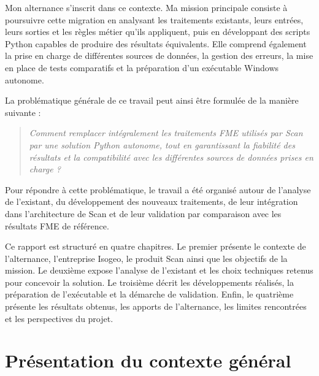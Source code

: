 Mon alternance s'inscrit dans ce contexte. Ma mission principale consiste à
poursuivre cette migration en analysant les traitements existants, leurs
entrées, leurs sorties et les règles métier qu'ils appliquent, puis en
développant des scripts Python capables de produire des résultats équivalents.
Elle comprend également la prise en charge de différentes sources de données,
la gestion des erreurs, la mise en place de tests comparatifs et la préparation
d'un exécutable Windows autonome.

La problématique générale de ce travail peut ainsi être formulée de la manière
suivante :

\begin{quote}
\textit{Comment remplacer intégralement les traitements FME utilisés par Scan
par une solution Python autonome, tout en garantissant la fiabilité des
résultats et la compatibilité avec les différentes sources de données prises en
charge ?}
\end{quote}

Pour répondre à cette problématique, le travail a été organisé autour de
l'analyse de l'existant, du développement des nouveaux traitements, de leur
intégration dans l'architecture de Scan et de leur validation par comparaison
avec les résultats FME de référence.

Ce rapport est structuré en quatre chapitres. Le premier présente le contexte de
l'alternance, l'entreprise Isogeo, le produit Scan ainsi que les objectifs de la
mission. Le deuxième expose l'analyse de l'existant et les choix techniques
retenus pour concevoir la solution. Le troisième décrit les développements
réalisés, la préparation de l'exécutable et la démarche de validation. Enfin, le
quatrième présente les résultats obtenus, les apports de l'alternance, les
limites rencontrées et les perspectives du projet.



\section{Présentation du contexte général}
\label{sec:contexte_general}


